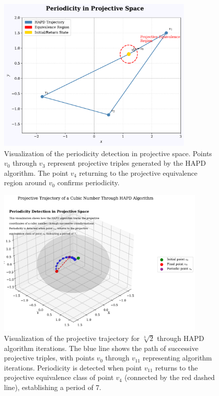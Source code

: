 \begin{figure}[ht]
\centering
\includegraphics[width=0.85\textwidth]{figures/output/projective_periodicity_visualization.pdf}
\caption{Visualization of the periodicity detection in projective space. Points $v_0$ through $v_3$ represent projective triples generated by the HAPD algorithm. The point $v_4$ returning to the projective equivalence region around $v_0$ confirms periodicity.}
\label{fig:projective_visualization}
\end{figure}

\begin{figure}[ht]
\centering
\includegraphics[width=0.9\textwidth]{../figures/output/projective_trajectory_visualization.pdf}
\caption{Visualization of the projective trajectory for $\sqrt[3]{2}$ through HAPD algorithm iterations. The blue line shows the path of successive projective triples, with points $v_0$ through $v_{11}$ representing algorithm iterations. Periodicity is detected when point $v_{11}$ returns to the projective equivalence class of point $v_4$ (connected by the red dashed line), establishing a period of 7.}
\label{fig:projective_trajectory}
\end{figure}

